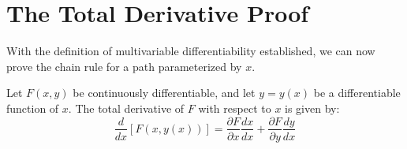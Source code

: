 \documentclass{essay}
\begin{document}
\section{The Total Derivative Proof}

With the definition of multivariable differentiability established, we can now prove the chain rule for a path parameterized by \(x\).

\begin{theorem}
  Let \(F(x,y)\) be continuously differentiable, and let \(y = y(x)\) be a differentiable function of \(x\). The total derivative of \(F\) with respect to \(x\) is given by:
  \[ \frac{d}{dx}[F(x, y(x))] = \frac{\partial F}{\partial x} \frac{dx}{dx} + \frac{\partial F}{\partial y} \frac{dy}{dx} \]
\end{theorem}
\end{document}
